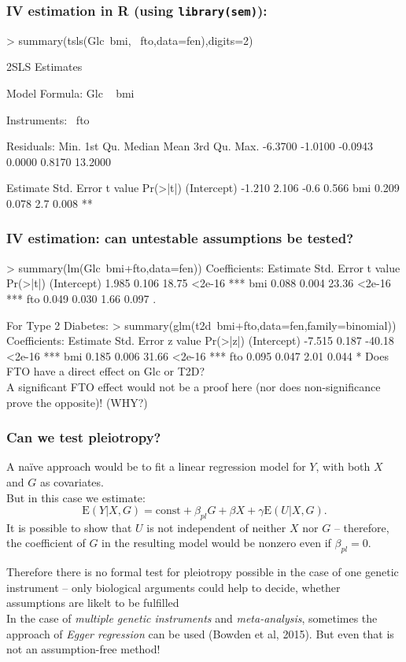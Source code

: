 \documentclass[xcolor=svgnames,handout]{beamer}
\newcommand{\code}[1]{\texttt{#1}}
\newcommand{\E}{\mathrm{E}}
\let\overbatim\verbatim
\let\endoverbatim\endverbatim
\newenvironment{vcode}%
{\bgroup\baselineskip=0.8\baselineskip\overbatim}%
{\endoverbatim\egroup}
\begin{document}
\begin{frame}[fragile]
\frametitle{IV estimation in R (using \code{library(sem)}):}
\small
\begin{vcode}
> summary(tsls(Glc~bmi, ~fto,data=fen),digits=2)

 2SLS Estimates

Model Formula: Glc ~ bmi

Instruments: ~fto

Residuals:
   Min. 1st Qu.  Median    Mean 3rd Qu.    Max. 
-6.3700 -1.0100 -0.0943  0.0000  0.8170 13.2000 

            Estimate Std. Error t value Pr(>|t|)   
(Intercept)   -1.210      2.106    -0.6    0.566   
bmi            0.209      0.078     2.7    0.008 **
\end{vcode}
\normalsize
\end{frame}

\begin{frame}[fragile]
\frametitle{IV estimation: can untestable assumptions be tested?}
\small
\begin{vcode}
> summary(lm(Glc~bmi+fto,data=fen))
Coefficients:
            Estimate Std. Error t value Pr(>|t|)    
(Intercept) 1.985  0.106   18.75   <2e-16 ***
bmi         0.088  0.004   23.36   <2e-16 ***
fto         0.049  0.030    1.66    0.097 .  

For Type 2 Diabetes:
> summary(glm(t2d~bmi+fto,data=fen,family=binomial))
Coefficients:
             Estimate Std. Error z value Pr(>|z|)    
(Intercept) -7.515   0.187  -40.18   <2e-16 ***
bmi          0.185   0.006   31.66   <2e-16 ***
fto          0.095   0.047    2.01    0.044 *  
\end{vcode}
\normalsize
Does FTO have a direct effect on Glc or T2D?  \\
\alert{A significant FTO effect would not be a proof here (nor does non-significance prove the opposite)! (WHY?)}
\end{frame}


\begin{frame}
\frametitle{Can we test pleiotropy?}
A na\"{i}ve approach would be to fit a linear regression model for $Y$, with both $X$ and $G$ as covariates.
\\
But in this case we estimate: 
\[
\E(Y|X, G) = \mbox{const} + \beta_{pl} G + \beta  X + \gamma \E(U|X, G).  
\]
It is possible to show that $U$ is not independent of neither $X$ nor $G$ -- therefore, the coefficient of $G$ in the resulting model would be nonzero even if $\beta_{pl}=0$.

\alert{Therefore there is no formal test for pleiotropy possible in the case of one genetic instrument -- only biological arguments could help to decide, whether assumptions are likelt to be fulfilled} \\
In the case of \emph{multiple genetic instruments} and \emph{meta-analysis}, sometimes the approach of \emph{Egger regression} can be used (Bowden et al, 2015). But even that is not an assumption-free method!
\end{frame}
\end{document}
